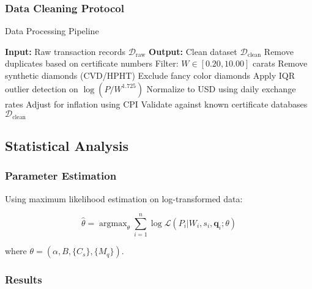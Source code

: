 \documentclass[12pt,a4paper]{article}
\DeclareMathOperator{\argmax}{argmax}
\theoremstyle{definition}
\theoremstyle{remark}
\begin{document}
\subsubsection{Data Cleaning Protocol}

\begin{algorithm}
\caption{Data Processing Pipeline}
\begin{algorithmic}
\STATE \textbf{Input:} Raw transaction records $\mathcal{D}_{\text{raw}}$
\STATE \textbf{Output:} Clean dataset $\mathcal{D}_{\text{clean}}$
\STATE
\STATE Remove duplicates based on certificate numbers
\STATE Filter: $W \in [0.20, 10.00]$ carats
\STATE Remove synthetic diamonds (CVD/HPHT)
\STATE Exclude fancy color diamonds
\STATE Apply IQR outlier detection on $\log(P/W^{1.725})$
\STATE Normalize to USD using daily exchange rates
\STATE Adjust for inflation using CPI
\STATE Validate against known certificate databases
\RETURN $\mathcal{D}_{\text{clean}}$
\end{algorithmic}
\end{algorithm}

\subsection{Statistical Analysis}

\subsubsection{Parameter Estimation}

Using maximum likelihood estimation on log-transformed data:

\begin{equation}
\hat{\theta} = \argmax_{\theta} \sum_{i=1}^n \log \mathcal{L}(P_i | W_i, s_i, \mathbf{q}_i; \theta)
\end{equation}

where $\theta = (\alpha, B, \{C_s\}, \{M_q\})$.

\subsubsection{Results}
\end{document}
